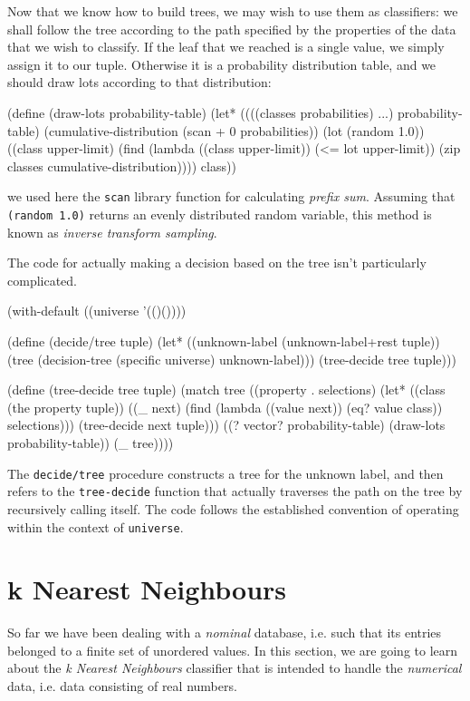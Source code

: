 Now that we know how to build trees, we may wish to use
them as classifiers: we shall follow the tree according
to the path specified by the properties of the data that
we wish to classify. If the leaf that we reached is
a single value, we simply assign it to our tuple.
Otherwise it is a probability distribution table, and
we should draw lots according to that distribution:

\begin{Snippet}
(define (draw-lots probability-table)
  (let* ((((classes probabilities) ...) probability-table)
	 (cumulative-distribution (scan + 0 probabilities))
	 (lot (random 1.0))
	 ((class upper-limit) (find (lambda ((class upper-limit))
				      (<= lot upper-limit))
				    (zip classes 
					 cumulative-distribution))))
    class))
\end{Snippet}

we used here the \texttt{scan} library function for calculating
\textit{prefix sum}. Assuming that \texttt{(random 1.0)} returns
an evenly distributed random variable, this method is known
as \textit{inverse transform sampling}.

The code for actually making a decision based on the tree
isn't particularly complicated.
\begin{Snippet}
(with-default ((universe '(()())))

  (define (decide/tree tuple)
    (let* ((unknown-label (unknown-label+rest tuple))
	   (tree (decision-tree (specific universe) unknown-label)))
      (tree-decide tree tuple)))
  
   (define (tree-decide tree tuple)
     (match tree
       ((property . selections)
	(let* ((class (the property tuple))
	       ((_ next) (find (lambda ((value next)) 
		                 (eq? value class)) 
			       selections)))
	  (tree-decide next tuple)))
       ((? vector? probability-table)
	(draw-lots probability-table))
       (_
	tree))))
\end{Snippet}
The \texttt{decide/tree} procedure constructs a tree for the
unknown label, and then refers to the \texttt{tree-decide}
function that actually traverses the path on the tree by
recursively calling itself. The code follows the established
convention of operating within the context of \texttt{universe}.

\section{k Nearest Neighbours}

So far we have been dealing with a \textit{nominal} database,
i.e. such that its entries belonged to a finite set of
unordered values. In this section, we are going to learn
about the \textit{k Nearest Neighbours} classifier that
is intended to handle the \textit{numerical} data, i.e.
data consisting of real numbers.

